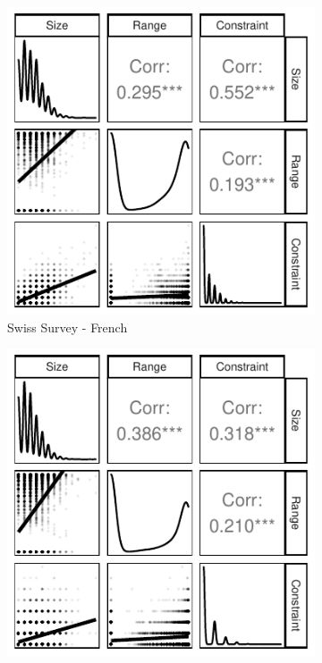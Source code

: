 \documentclass[12pt]{article}
\begin{document}
\begin{figure}[h]
	\begin{subfigure}[h]{0.27\textwidth}
		\centering
		\includegraphics[width=\textwidth]{../out/appB4f-french_components.pdf}
		\caption{Swiss Survey - French}
	\end{subfigure}%
	\begin{subfigure}[h]{0.27\textwidth}
		\centering
		\includegraphics[width=\textwidth]{../out/appB4g-german_components.pdf}

\end{subfigure}
\end{figure}
\end{document}
